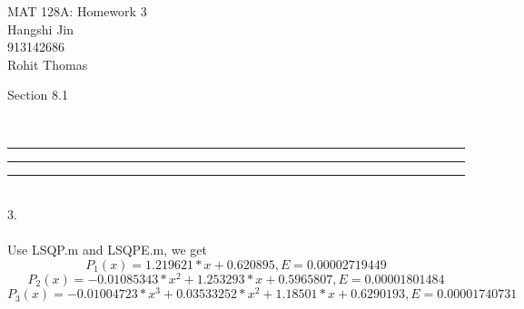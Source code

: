 \documentclass{article}
\begin{document}
\begin{flushright}MAT 128A: Homework 3\\ Hangshi Jin\\ 913142686\\ Rohit Thomas
\end{flushright}
\begin{large}Section 8.1\end{large}
\\\noindent\rule{16cm}{0.4pt}\noindent\rule{16cm}{0.4pt}
\noindent\rule{16cm}{0.4pt}
\\3.
\\\\Use LSQP.m and LSQPE.m, we get
\[P_1(x)=1.219621*x + 0.620895,E=0.00002719449\]
\[P_2(x)=- 0.01085343*x^2 + 1.253293*x + 0.5965807,E=0.00001801484\]
\[P_3(x)=- 0.01004723*x^3 + 0.03533252*x^2 + 1.18501*x + 0.6290193,E=0.00001740731\]
\end{document}

